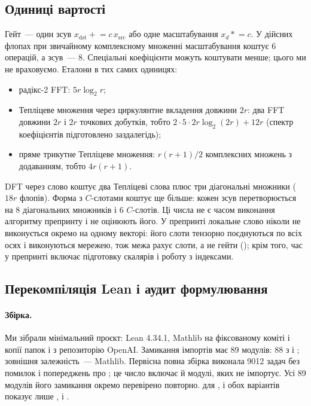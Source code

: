 \documentclass[11pt]{article}
\theoremstyle{plain}
\begin{document}
\subsection{Одиниці вартості}\label{sec:cost-units}
Гейт~--- один зсув $x_{\mathrm{dst}}\mathrel{+}=c\,x_{\mathrm{src}}$ або одне масштабування $x_d\mathrel{*}=c$. У дійсних флопах при звичайному комплексному множенні масштабування коштує 6 операцій, а зсув~--- 8. Спеціальні коефіцієнти можуть коштувати менше; цього ми не враховуємо. Еталони в тих самих одиницях:
\begin{itemize}
\item радікс-2 FFT: $5r\log_2 r$;
\item Тепліцеве множення через циркулянтне вкладення довжини $2r$: два FFT довжини $2r$ і $2r$ точкових добутків, тобто $2\cdot5\cdot2r\log_2(2r)+12r$ (спектр коефіцієнтів підготовлено заздалегідь);
\item пряме трикутне Тепліцеве множення: $r(r+1)/2$ комплексних множень з додаванням, тобто $4r(r+1)$.
\end{itemize}
DFT через слово коштує два Тепліцеві слова плюс три діагональні множники ($18r$ флопів). Форма з $C$-слотами коштує ще більше: кожен зсув перетворюється на 8 діагональних множників і 6 $C$-слотів. Ці числа не є часом виконання алгоритму препринту і не оцінюють його. У препринті локальне слово ніколи не виконується окремо на одному векторі: його слоти тензорно поєднуються по всіх осях і виконуються мережею, тож межа рахує слоти, а не гейти (); крім того, час у препринті включає підготовку скалярів і роботу з індексами.

\subsection{Перекомпіляція Lean і аудит формулювання}\label{sec:lean}
\paragraph{Збірка.}
Ми зібрали мінімальний проєкт: Lean 4.34.1, Mathlib на фіксованому коміті  і копії папок  і  з репозиторію OpenAI. Замикання імпортів  має 89 модулів: 88 з  і ; зовнішня залежність~--- Mathlib. Первісна повна збірка виконала 9012 задач без помилок і попереджень про ; це число включає й модулі, яких  не імпортує. Усі 89 модулів його замикання окремо перевірено повторно.  для ,  і обох варіантів  показує лише ,  і .
\end{document}
